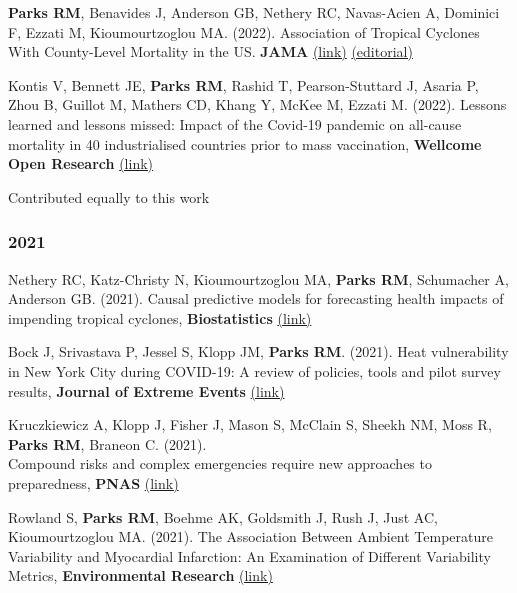 \noindent \textbf{Parks RM}, Benavides J, Anderson GB, Nethery RC, Navas-Acien A, Dominici F, Ezzati M, Kioumourtzoglou MA. (2022). Association of Tropical Cyclones With County-Level Mortality in the US. \textbf{JAMA} \href{https://jamanetwork.com/journals/jama/fullarticle/2789661}{(link)} \href{https://jamanetwork.com/journals/jama/fullarticle/2789676}{(editorial)} \bigskip

\noindent Kontis V, Bennett JE, \textbf{Parks RM}, Rashid T, Pearson-Stuttard J, Asaria P, Zhou B, Guillot M, Mathers CD, Khang Y, McKee M, Ezzati M. (2022). Lessons learned and lessons missed: Impact of the Covid-19 pandemic on all-cause mortality in 40 industrialised countries prior to mass vaccination, \textbf{Wellcome Open Research} \href{https://wellcomeopenresearch.org/articles/6-279/v2}{(link)} \bigskip

\noindent * Contributed equally to this work

\subsubsection*{2021}

\noindent Nethery RC, Katz-Christy N, Kioumourtzoglou MA, \textbf{Parks RM}, Schumacher A, Anderson GB. (2021). Causal predictive models for forecasting health impacts of impending tropical cyclones, \textbf{Biostatistics} \href{https://academic.oup.com/biostatistics/advance-article/doi/10.1093/biostatistics/kxab047/6485226?guestAccessKey=378fb8f6-102d-4b21-a93d-b0a01353c19f#}{(link)} \bigskip

\noindent Bock J, Srivastava P, Jessel S, Klopp JM, \textbf{Parks RM}. (2021). Heat vulnerability in New York City during COVID-19: A review of policies, tools and pilot survey results, \textbf{Journal of Extreme Events} \href{https://www.worldscientific.com/doi/10.1142/S2345737621500159}{(link)} \bigskip

\noindent Kruczkiewicz A, Klopp J, Fisher J, Mason S, McClain S, Sheekh NM, Moss R, \textbf{Parks RM}, Braneon C. (2021).\\Compound risks and complex emergencies require new approaches to preparedness, \textbf{PNAS} \href{https://www.pnas.org/content/118/19/e2106795118}{(link)} \bigskip

\noindent Rowland S, \textbf{Parks RM}, Boehme AK, Goldsmith J, Rush J, Just AC, Kioumourtzoglou MA. (2021). The Association Between Ambient Temperature Variability and Myocardial Infarction: An Examination of Different Variability Metrics, \textbf{Environmental Research} \href{https://www.sciencedirect.com/science/article/pii/S0013935121005016}{(link)} \bigskip

